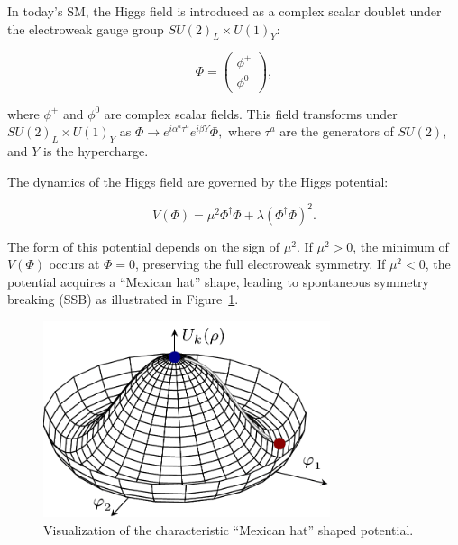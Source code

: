 


In today's SM, the Higgs field is introduced as a complex scalar doublet under the electroweak gauge group \( SU(2)_L \times U(1)_Y \):

\begin{equation}
\label{eq:higgscalar}
    \Phi = \begin{pmatrix} \phi^+ \\ \phi^0 \end{pmatrix},
\end{equation}

where \( \phi^+ \) and \( \phi^0 \) are complex scalar fields. This field transforms under \( SU(2)_L \times U(1)_Y \) as \(\Phi \to e^{i\alpha^a \tau^a} e^{i\beta Y} \Phi,\) where \( \tau^a \) are the generators of \( SU(2) \), and \( Y \) is the hypercharge.

The dynamics of the Higgs field are governed by the Higgs potential:

\begin{equation}
\label{eq:higgpot}
V(\Phi) = \mu^2 \Phi^\dagger \Phi + \lambda (\Phi^\dagger \Phi)^2.
\end{equation}

The form of this potential depends on the sign of \( \mu^2 \). If \( \mu^2 > 0 \), the minimum of \( V(\Phi) \) occurs at \( \Phi = 0 \), preserving the full electroweak symmetry. If \( \mu^2 < 0 \), the potential acquires a ``Mexican hat'' shape, leading to spontaneous symmetry breaking (SSB) as illustrated in Figure~\ref{fig:mexicanhat}.

\begin{figure}[!hbt]
  \centering
  \includegraphics[width=0.75\textwidth,clip] {figures/mexican-hat.png}
  \caption{Visualization of the characteristic ``Mexican hat'' shaped potential.}
  \label{fig:mexicanhat}
\end{figure}

